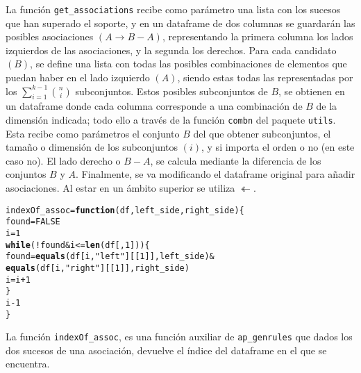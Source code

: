 \documentclass[12pt]{report}\usepackage[]{graphicx}\usepackage[dvipsnames]{xcolor}
\makeatletter
\newcommand{\hlnum}[1]{\textcolor[rgb]{0.686,0.059,0.569}{#1}}%
\newcommand{\hlstr}[1]{\textcolor[rgb]{0.192,0.494,0.8}{#1}}%
\newcommand{\hlopt}[1]{\textcolor[rgb]{0,0,0}{#1}}%
\newcommand{\hlstd}[1]{\textcolor[rgb]{0.345,0.345,0.345}{#1}}%
\newcommand{\hlkwa}[1]{\textcolor[rgb]{0.161,0.373,0.58}{\textbf{#1}}}%
\newcommand{\hlkwb}[1]{\textcolor[rgb]{0.69,0.353,0.396}{#1}}%
\newcommand{\hlkwc}[1]{\textcolor[rgb]{0.333,0.667,0.333}{#1}}%
\newcommand{\hlkwd}[1]{\textcolor[rgb]{0.737,0.353,0.396}{\textbf{#1}}}%
\newenvironment{kframe}{%
 \def\at@end@of@kframe{}%
 \ifinner\ifhmode%
  \def\at@end@of@kframe{\end{minipage}}%
  \begin{minipage}{\columnwidth}%
 \fi\fi%
 \def\FrameCommand##1{\hskip\@totalleftmargin \hskip-\fboxsep
 \colorbox{shadecolor}{##1}\hskip-\fboxsep
     \hskip-\linewidth \hskip-\@totalleftmargin \hskip\columnwidth}%
 \MakeFramed {\advance\hsize-\width
   \@totalleftmargin\z@ \linewidth\hsize
   \@setminipage}}%
 {\par\unskip\endMakeFramed%
 \at@end@of@kframe}
\newenvironment{knitrout}{}{} %
\makeatother
\begin{document}
			La función \texttt{get\_associations} recibe como parámetro una lista con los sucesos que han superado el soporte, y en un dataframe de dos columnas se guardarán las posibles asociaciones $(A \rightarrow B - A)$, representando la primera columna los lados izquierdos de las asociaciones, y la segunda los derechos. Para cada candidato $(B)$, se define una lista con todas las posibles combinaciones de elementos que puedan haber en el lado izquierdo $(A)$, siendo estas todas las representadas por los $\sum_{i = 1}^{k-1}\binom{n}{i}$ subconjuntos. Estos posibles subconjuntos de $B$, se obtienen en un dataframe donde cada columna corresponde a una combinación de $B$ de la dimensión indicada; todo ello a través de la función \texttt{combn} del paquete \texttt{utils}. Esta recibe como parámetros el conjunto $B$ del que obtener subconjuntos, el tamaño o dimensión de los subconjuntos $(i)$, y si importa el orden o no (en este caso no). El lado derecho o $B - A$, se calcula mediante la diferencia de los conjuntos $B$ y $A$. Finalmente, se va modificando el dataframe original para añadir asociaciones. Al estar en un ámbito superior se utiliza $\twoheadleftarrow$. 
			
\begin{knitrout}
\color{fgcolor}\begin{kframe}
\begin{alltt}
\hlstd{indexOf_assoc} \hlkwb{=} \hlkwa{function}\hlstd{(}\hlkwc{df}\hlstd{,} \hlkwc{left_side}\hlstd{,} \hlkwc{right_side}\hlstd{) \{}
        \hlstd{found} \hlkwb{=} \hlnum{FALSE}
        \hlstd{i} \hlkwb{=} \hlnum{1}
        \hlkwa{while}\hlstd{(}\hlopt{!}\hlstd{found} \hlopt{&} \hlstd{i} \hlopt{<=} \hlkwd{len}\hlstd{(df[,}\hlnum{1}\hlstd{])) \{}
                \hlstd{found} \hlkwb{=} \hlkwd{equals}\hlstd{(df[i,} \hlstr{"left"}\hlstd{][[}\hlnum{1}\hlstd{]], left_side)} \hlopt{&}
                        \hlkwd{equals}\hlstd{(df[i,} \hlstr{"right"}\hlstd{][[}\hlnum{1}\hlstd{]], right_side)}
                \hlstd{i} \hlkwb{=} \hlstd{i} \hlopt{+} \hlnum{1}
        \hlstd{\}}
        \hlstd{i}\hlopt{-}\hlnum{1}
\hlstd{\}}
\end{alltt}
\end{kframe}
\end{knitrout}
			
			La función \texttt{indexOf\_assoc}, es una función auxiliar de \texttt{ap\_genrules} que dados los dos sucesos de una asociación, devuelve el índice del dataframe en el que se encuentra. 
			
\end{document}

